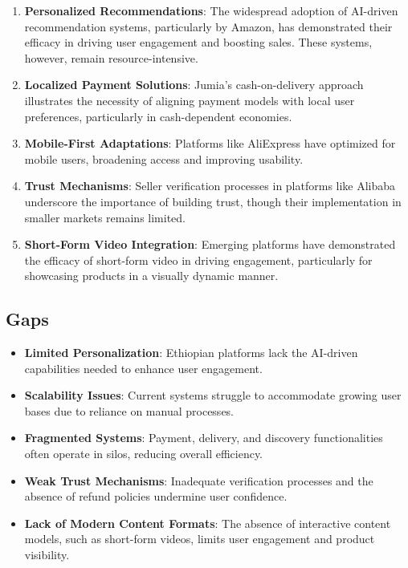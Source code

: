 \documentclass[12pt]{report}
\begin{document}
\begin{enumerate}
	\item \textbf{Personalized Recommendations}: The widespread adoption of AI-driven
	      recommendation systems, particularly by Amazon, has demonstrated their efficacy in
	      driving user engagement and boosting sales. These systems, however, remain
	      resource-intensive. \cite{c16}
	\item \textbf{Localized Payment Solutions}: Jumia’s cash-on-delivery approach illustrates the
	      necessity of aligning payment models with local user preferences, particularly in
	      cash-dependent economies. \cite{c18}
	\item \textbf{Mobile-First Adaptations}: Platforms like AliExpress have optimized for mobile
	      users, broadening access and improving usability. \cite{c17}
	\item \textbf{Trust Mechanisms}: Seller verification processes in platforms like Alibaba
	      underscore the importance of building trust, though their implementation in smaller
	      markets remains limited. \cite{c16}
	\item \textbf{Short-Form Video Integration}: Emerging platforms have demonstrated the efficacy
	      of short-form video in driving engagement, particularly for showcasing products in a
	      visually dynamic manner. \cite{c19}
\end{enumerate}

\subsection*{Gaps}

\begin{itemize}
	\item \textbf{Limited Personalization}: Ethiopian platforms lack the AI-driven capabilities needed
	      to enhance user engagement.
	\item \textbf{Scalability Issues}: Current systems struggle to accommodate growing user bases due
	      to reliance on manual processes.
	\item \textbf{Fragmented Systems}: Payment, delivery, and discovery functionalities often operate
	      in silos, reducing overall efficiency.
	\item \textbf{Weak Trust Mechanisms}: Inadequate verification processes and the absence of
	      refund policies undermine user confidence.
	\item \textbf{Lack of Modern Content Formats}: The absence of interactive content models, such
	      as short-form videos, limits user engagement and product visibility.
\end{itemize}
\end{document}
